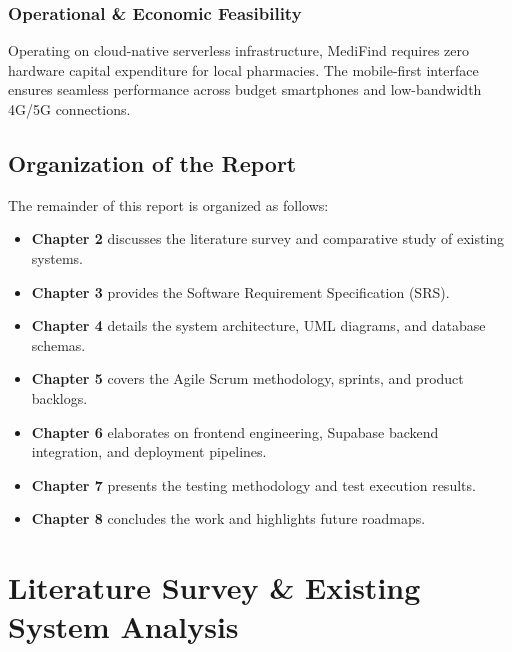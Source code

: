 \documentclass[12pt,a4paper]{report}
\begin{document}
\subsection{Operational \& Economic Feasibility}
Operating on cloud-native serverless infrastructure, MediFind requires zero hardware capital expenditure for local pharmacies. The mobile-first interface ensures seamless performance across budget smartphones and low-bandwidth 4G/5G connections.

\section{Organization of the Report}
The remainder of this report is organized as follows:
\begin{itemize}
    \item \textbf{Chapter 2} discusses the literature survey and comparative study of existing systems.
    \item \textbf{Chapter 3} provides the Software Requirement Specification (SRS).
    \item \textbf{Chapter 4} details the system architecture, UML diagrams, and database schemas.
    \item \textbf{Chapter 5} covers the Agile Scrum methodology, sprints, and product backlogs.
    \item \textbf{Chapter 6} elaborates on frontend engineering, Supabase backend integration, and deployment pipelines.
    \item \textbf{Chapter 7} presents the testing methodology and test execution results.
    \item \textbf{Chapter 8} concludes the work and highlights future roadmaps.
\end{itemize}

\newpage
\chapter{Literature Survey \& Existing System Analysis}
\end{document}
